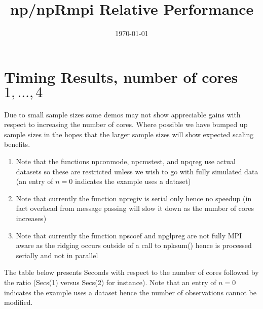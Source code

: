 \documentclass[]{amsart}
\date{\today}
\title{np/npRmpi Relative Performance}
\begin{document}
\maketitle

\section*{Timing Results, number of cores $1,\dots,4$}

Due to small sample sizes some demos may not show appreciable gains
with respect to increasing the number of cores. Where possible we have
bumped up sample sizes in the hopes that the larger sample sizes will
show expected scaling benefits.  

\begin{enumerate}

\item Note that the functions npconmode, npcmstest, and npqreg use
  actual datasets so these are restricted unless we wish to go with
  fully simulated data (an entry of $n=0$ indicates the example uses a
  dataset)

\item Note that currently the function npregiv is serial only hence no
  speedup (in fact overhead from message passing will slow it down as
  the number of cores increases)

\item Note that currently the function npscoef and npglpreg are not
  fully MPI aware as the ridging occurs outside of a call to npksum()
  hence is processed serially and not in parallel

\end{enumerate}

The table below presents Seconds with respect to the number of cores
followed by the ratio (Secs(1) versus Secs(2) for instance). Note that
an entry of $n=0$ indicates the example uses a dataset hence the
number of observations cannot be modified.

\begin{table}[!ht]
\scriptsize


\end{table}

\begin{table}[!ht]
\scriptsize

\end{table}
\end{document}
